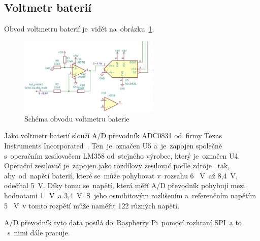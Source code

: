 \subsection{Voltmetr baterií}
Obvod voltmetru baterií je~vidět na~obrázku~\ref{fig:bat_probe}.

\begin{figure}[htb]
  \centering
  \includegraphics[width=0.6\textwidth]{img/bat_probe.jpg}
  \caption{\label{fig:bat_probe} Schéma obvodu voltmetru baterie}
\end{figure}

Jako voltmetr baterií slouží A/D převodník ADC0831 od~firmy Texas Instruments Incorporated~\cite{adc0831-dsh}.  Ten~je~označen U5  a~je~zapojen společně  s~operačním zesilovačem LM358 od~stejného výrobce, který je~označen U4.
Operační zesilovač je~zapojen jako rozdílový zesilovač podle zdroje~\cite{odcitacka} tak,  aby~od~napětí baterií, které se~může pohybovat  v~rozsahu 6 ~V~až 8,4~V, odečítal 5~V.
Díky tomu se~napětí, která měří A/D převodník pohybují mezi hodnotami 1 ~V~a 3,4~V.  S~jeho osmibitovým rozlišením  a~referenčním napětím 5 ~V~v tomto rozpětí může naměřit 122 různých napětí.

A/D převodník tyto data posílá do~Raspberry Pi~pomocí rozhraní  SPI~a to ~s~nimi dále pracuje.
